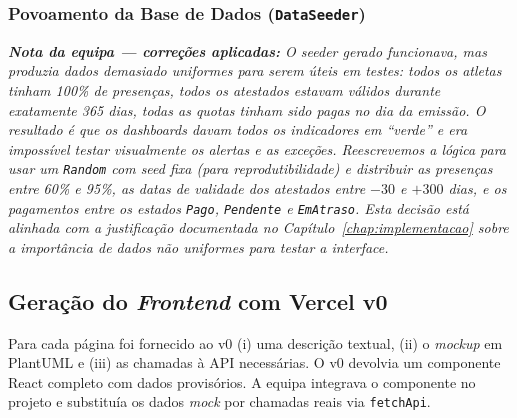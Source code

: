 \subsubsection*{Povoamento da Base de Dados (\texttt{DataSeeder})}


\noindent\textit{\textbf{Nota da equipa --- correções aplicadas:} O \textit{seeder} gerado funcionava, mas produzia dados \emph{demasiado uniformes} para serem úteis em testes: todos os atletas tinham 100\% de presenças, todos os atestados estavam válidos durante exatamente 365 dias, todas as quotas tinham sido pagas no dia da emissão. O resultado é que os \textit{dashboards} davam todos os indicadores em ``verde'' e era impossível testar visualmente os alertas e as exceções. Reescrevemos a lógica para usar um \texttt{Random} com \textit{seed} fixa (para reprodutibilidade) e distribuir as presenças entre 60\% e 95\%, as datas de validade dos atestados entre $-30$ e $+300$ dias, e os pagamentos entre os estados \texttt{Pago}, \texttt{Pendente} e \texttt{EmAtraso}. Esta decisão está alinhada com a justificação documentada no Capítulo~\ref{chap:implementacao} sobre a importância de dados não uniformes para testar a interface.}

\subsection{Geração do \textit{Frontend} com Vercel v0}\label{subsec:ia_impl_frontend}

Para cada página foi fornecido ao v0 (i) uma descrição textual, (ii) o \textit{mockup} em PlantUML e (iii) as chamadas à API necessárias. O v0 devolvia um componente React completo com dados provisórios. A equipa integrava o componente no projeto e substituía os dados \textit{mock} por chamadas reais via \texttt{fetchApi}.

